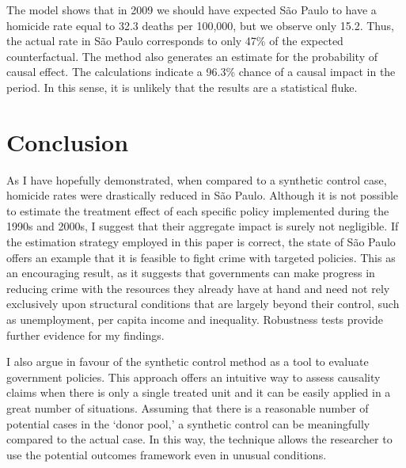 The model shows that in 2009 we should have expected São Paulo to have a homicide rate equal to 32.3 deaths per 100,000, but we observe only 15.2. Thus, the actual rate in São Paulo corresponds to only 47\% of the expected counterfactual. The method also generates an estimate for the probability of causal effect. The calculations indicate a 96.3\% chance of a causal impact in the period. In this sense, it is unlikely that the results are a statistical fluke.

\section{Conclusion}
\label{sec:conclusion}

As I have hopefully demonstrated, when compared to a synthetic control case, homicide rates were drastically reduced in São Paulo. Although it is not possible to estimate the treatment effect of each specific policy implemented during the 1990s and 2000s, I suggest that their aggregate impact is surely not negligible. If the estimation strategy employed in this paper is correct, the state of São Paulo offers an example that it is feasible to fight crime with targeted policies. This as an encouraging result, as it suggests that governments can make progress in reducing crime with the resources they already have at hand and need not rely exclusively upon structural conditions that are largely beyond their control, such as unemployment, per capita income and inequality. Robustness tests provide further evidence for my findings.

I also argue in favour of the synthetic control method as a tool to evaluate government policies. This approach offers an intuitive way to assess causality claims when there is only a single treated unit and it can be easily applied in a great number of situations. Assuming that there is a reasonable number of potential cases in the `donor pool,' a synthetic control can be meaningfully compared to the actual case. In this way, the technique allows the researcher to use the potential outcomes framework even in unusual conditions.

